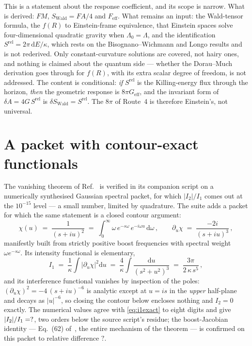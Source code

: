 \documentclass[11pt,a4paper]{article}
\newcommand{\NFJacobianDev}{?}\newcommand{\NFMomOneContour}{?}
\newcommand{\Srel}{S^{\mathrm{rel}}}
\newcommand{\dd}{\mathrm{d}}
\theoremstyle{plain}
\theoremstyle{definition}
\begin{document}
This is a statement about the response coefficient, and its scope is narrow.
What is derived: $F M$, $S_{\mathrm{Wald}} = FA/4$ and $F_{\mathrm{eff}}$.
What remains an input: the Wald-tensor formula, the $f(R)$ to Einstein-frame
equivalence, that Einstein spaces solve four-dimensional quadratic gravity when
$\Lambda_0 = \Lambda$, and the identification $\Srel = 2\pi\,\dd E/\kappa$,
which rests on the Bisognano--Wichmann and Longo results and is not
rederived. Only constant-curvature solutions are covered, not hairy ones, and
nothing is claimed about the quantum side --- whether the Dorau--Much
derivation goes through for $f(R)$, with its extra scalar degree of freedom,
is not addressed. The content is conditional: \emph{if} $\Srel$ is the
Killing-energy flux through the horizon, \emph{then} the geometric response
is $8\pi G_{\mathrm{eff}}$, and the invariant form of $\delta A = 4G\,\Srel$ is
$\delta S_{\mathrm{Wald}} = \Srel$. The $8\pi$ of Route~4 is therefore
Einstein's, not universal.


\section{A packet with contour-exact functionals}
\label{sec:contour}

The vanishing theorem of Ref.~\cite{NariaiI} is verified in its companion
script on a numerically synthesised Gaussian spectral packet, for which
$|I_2|/I_1$ comes out at the $10^{-15}$ level --- a small number, limited by
quadrature. The suite adds a packet for which the same statement is a closed
contour argument:
%
\begin{equation}
\chi(u) \;=\; \frac{1}{(s + i u)^2}
\;=\; \int_0^\infty \omega\, e^{-s\omega}\, e^{-i\omega u}\, \dd\omega\,,
\qquad
\partial_u \chi \;=\; \frac{-2i}{(s+iu)^3}\,,
\label{eq:contourpacket}
\end{equation}
%
manifestly built from strictly positive boost frequencies with spectral
weight $\omega e^{-s\omega}$. Its intensity functional is elementary,
%
\begin{equation}
I_1 \;=\; \frac{1}{\kappa}\int \bigl|\partial_u\chi\bigr|^2 \dd u
\;=\; \frac{4}{\kappa}\int \frac{\dd u}{(s^2+u^2)^3}
\;=\; \frac{3\pi}{2\,\kappa\, s^5}\,,
\label{eq:i1exact}
\end{equation}
%
and its interference functional vanishes by inspection of the poles:
$(\partial_u\chi)^2 = -4\,(s+iu)^{-6}$ is analytic except at $u = is$ in the
\emph{upper} half-plane and decays as $|u|^{-6}$, so closing the contour
below encloses nothing and $I_2 = 0$ exactly. The numerical values agree
with \cref{eq:i1exact} to eight digits and give $|I_2|/I_1 = ?$,
two orders below the source script's residue; the boost-Jacobian identity
--- Eq.~(62) of~\cite{NariaiI}, the entire mechanism of the theorem --- is
confirmed on this packet to relative difference $\NFJacobianDev$.
\end{document}
